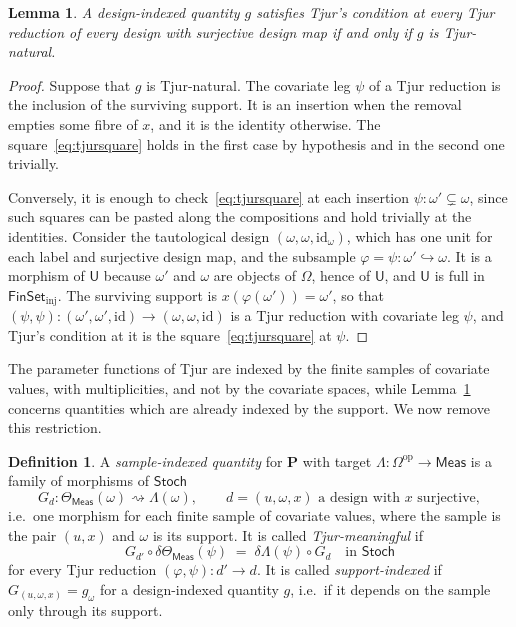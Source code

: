 \documentclass[11pt,a4paper]{article}
\theoremstyle{plain}
\newtheorem{lemma}[theorem]{Lemma}
\theoremstyle{definition}
\newtheorem{definition}[theorem]{Definition}
\theoremstyle{remark}
\newcommand{\cat}[1]{\mathsf{#1}}
\newcommand{\catU}{\cat{U}}
\newcommand{\catO}{\cat{\Omega}}
\newcommand{\Meas}{\cat{Meas}}
\newcommand{\Stoch}{\cat{Stoch}}
\newcommand{\FinSet}{\cat{FinSet}}
\newcommand{\op}{\mathrm{op}}
\newcommand{\id}{\mathrm{id}}
\newcommand{\del}{\delta}
\begin{document}
\begin{lemma}\label{lem:tjurshadow}
A design-indexed quantity $g$ satisfies Tjur's condition at every Tjur
reduction of every design with surjective design map if and only if $g$ is
Tjur-natural.
\end{lemma}

\begin{proof}
Suppose that $g$ is Tjur-natural. The covariate leg $\psi$ of a Tjur reduction
is the inclusion of the surviving support. It is an insertion when the removal
empties some fibre of $x$, and it is the identity otherwise. The
square~\eqref{eq:tjursquare} holds in the first case by hypothesis and in the
second one trivially.

Conversely, it is enough to check~\eqref{eq:tjursquare} at each insertion
$\psi \colon \omega' \subsetneq \omega$, since such squares can be pasted along
the compositions and hold trivially at the identities. Consider the
tautological design $(\omega,\omega,\id_\omega)$, which has one unit for each
label and surjective design map, and the subsample
$\varphi = \psi \colon \omega' \hookrightarrow \omega$. It is a morphism of
$\catU$ because $\omega'$ and $\omega$ are objects of $\catO$, hence of
$\catU$, and $\catU$ is full in $\FinSet_{\mathrm{inj}}$. The surviving
support is $x(\varphi(\omega')) = \omega'$, so that
$(\psi,\psi) \colon (\omega',\omega',\id) \to (\omega,\omega,\id)$ is a Tjur
reduction with covariate leg $\psi$, and Tjur's condition at it is the
square~\eqref{eq:tjursquare} at $\psi$.
\end{proof}

The parameter functions of Tjur are indexed by the finite samples of covariate
values, with multiplicities, and not by the covariate spaces, while
Lemma~\ref{lem:tjurshadow} concerns quantities which are already indexed by the
support. We now remove this restriction.

\begin{definition}\label{def:sampleindexed}
A \emph{sample-indexed quantity} for $\mathbf P$ with target
$\Lambda \colon \catO^{\op} \to \Meas$ is a family of morphisms of $\Stoch$
\[
G_{d} \colon \Theta_\Meas(\omega) \rightsquigarrow \Lambda(\omega),
\qquad d = (u,\omega,x) \text{ a design with } x \text{ surjective},
\]
i.e.\ one morphism for each finite sample of covariate values, where the
sample is the pair $(u,x)$ and $\omega$ is its support. It is called
\emph{Tjur-meaningful} if
\begin{equation}\label{eq:sampletjur}
G_{d'} \circ \del\Theta_\Meas(\psi) \;=\; \del\Lambda(\psi) \circ G_{d}
\quad\text{in } \Stoch
\end{equation}
for every Tjur reduction $(\varphi,\psi) \colon d' \to d$. It is called
\emph{support-indexed} if $G_{(u,\omega,x)} = g_{\omega}$ for a design-indexed
quantity $g$, i.e.\ if it depends on the sample only through its support.
\end{definition}
\end{document}
